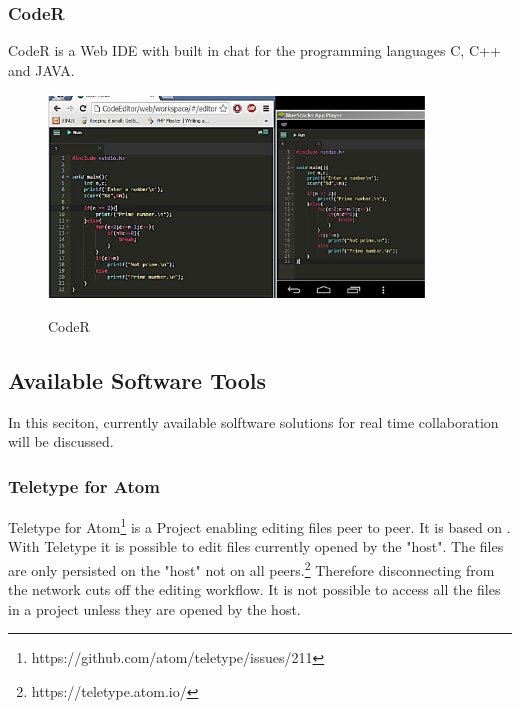 \subsubsection{CodeR}
CodeR\cite{KurniawanSoesantoWijaya:2015:CodeR:Real-timeCodeEditorApplicationforCollaborativeProgramming} is a Web IDE with built in chat for the programming languages C, C++ and JAVA. 
\begin{figure}[hb]
    \centering
    \includegraphics[width=100mm]{figures/screenshots/CodeR.png}
	\caption{CodeR }
	\cite{KurniawanSoesantoWijaya:2015:CodeR:Real-timeCodeEditorApplicationforCollaborativeProgramming}
    \label{fig:touchdevelop}
\end{figure}

\newpage
\subsection{Available Software Tools}

In this seciton, currently available solftware solutions for real time collaboration will be discussed.

\subsubsection{Teletype for Atom}
Teletype for Atom\footnote{https://github.com/atom/teletype/issues/211} is a Project enabling editing files peer to peer. It is based on 	\cite{Oster:2006:DataconsistencyforP2Pcollaborativeediting} \cite{YuWeihai:2014} \cite{BriotUrsoShapiro:2016:HighResponsivenessGroupEditing}.
With Teletype it is possible to edit files currently opened by the "host". The files are only persisted on the "host" not on all peers.\footnote{https://teletype.atom.io/}
Therefore disconnecting from the network cuts off the editing workflow. It is not possible to access all the files in a project unless they are opened by the host. 
